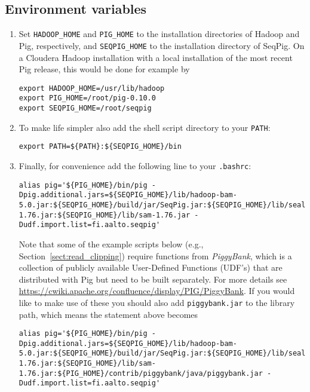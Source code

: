 \subsection{Environment variables}
\label{sect:install_env}
\begin{enumerate}
\item Set {\tt HADOOP\_HOME} and {\tt PIG\_HOME} to the installation
directories of Hadoop and Pig, respectively, and {\tt SEQPIG\_HOME} to
the installation directory of SeqPig. On a Cloudera Hadoop installation
with a local installation of the most recent Pig release, this would be
done for example by
\begin{lstlisting} 
export HADOOP_HOME=/usr/lib/hadoop
export PIG_HOME=/root/pig-0.10.0
export SEQPIG_HOME=/root/seqpig 
\end{lstlisting}
%
\item To make life simpler also add the shell script directory to your {\tt PATH}:
%
\begin{lstlisting} 
export PATH=${PATH}:${SEQPIG_HOME}/bin
\end{lstlisting}
%
\item Finally, for convenience add the following line to your {\tt .bashrc}:
%
\begin{lstlisting} 
alias pig='${PIG_HOME}/bin/pig -Dpig.additional.jars=${SEQPIG_HOME}/lib/hadoop-bam-5.0.jar:${SEQPIG_HOME}/build/jar/SeqPig.jar:${SEQPIG_HOME}/lib/seal.jar:${SEQPIG_HOME}/lib/picard-1.76.jar:${SEQPIG_HOME}/lib/sam-1.76.jar -Dudf.import.list=fi.aalto.seqpig' 
\end{lstlisting}
%
Note that some of the example scripts below (e.g.,
Section~\ref{sect:read_clipping}) require functions from \emph{PiggyBank},
which is a collection of publicly available User-Defined Functions (UDF's)
that are distributed with Pig but need to be built separately.
For more details see
\url{https://cwiki.apache.org/confluence/display/PIG/PiggyBank}. If you would like to
make use of these you should also add {\tt piggybank.jar} to the library path, which
means the statement above becomes
\begin{lstlisting} 
alias pig='${PIG_HOME}/bin/pig -Dpig.additional.jars=${SEQPIG_HOME}/lib/hadoop-bam-5.0.jar:${SEQPIG_HOME}/build/jar/SeqPig.jar:${SEQPIG_HOME}/lib/seal.jar:${SEQPIG_HOME}/lib/picard-1.76.jar:${SEQPIG_HOME}/lib/sam-1.76.jar:${PIG_HOME}/contrib/piggybank/java/piggybank.jar -Dudf.import.list=fi.aalto.seqpig' 
\end{lstlisting}
\end{enumerate}

